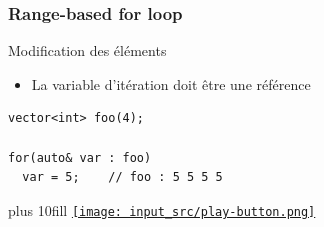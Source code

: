 \documentclass[C++.tex]{subfiles}
\begin{document}
\begin{frame}[fragile]
	\frametitle{Range-based for loop}
	\begin{alertblock}{Modification des éléments}
		\begin{itemize}
			\item La variable d'itération doit être une référence
		\end{itemize}
	\end{alertblock}

	\begin{lstlisting}
vector<int> foo(4);

for(auto& var : foo)
  var = 5;    // foo : 5 5 5 5\end{lstlisting}

	\vskip 10mm plus 10fill
	\hfill
	\href{https://godbolt.org/#z:OYLghAFBqd5QCxAYwPYBMCmBRdBLAF1QCcAaPECAMzwBtMA7AQwFtMQByARg9KtQYEAysib0QXACx8BBAKoBnTAAUAHpwAMvAFYTStJg1DIApACYAQuYukl9ZATwDKjdAGFUtAK4sGe1wAyeAyYAHI%2BAEaYxCAAzADspAAOqAqETgwe3r56KWmOAkEh4SxRMQm2mPYFDEIETMQEWT5%2BXJXVGXUNBEVhkdFxiQr1jc05bcPdvSVlgwCUtqhexMjsHOaxwcjeWADUJrFuTsPEmKwH2CYaAIIbWzuY%2B4cAbpgOJBdXtzfBBLssTGCEDmXxM8SsN12%2B3BXyhUOG6BAIFe72IByOgguu34qDBFmkuwAHKRdlwzCSEmCACIHCHXOHYkgQX67Z4NXYgRmoEGQuF42EM3YIpFoLx/dHo1nsiWHXZgDhy9axOkM6kC%2BEEREoJbiw6S%2BUmACsbgYBuVArVNwtMN5Gq1KKIaMOvyxOLxBOJpPJu0p8Rp5ttjOIECYYtQUuIHK5PPpfJtsYZwu1YqebklbMjMrcisVtPV0JpgaTot1adlBuNpqVKoLoN5/KLmqRDo%2BzsxsWwXIgkhBAYTQZDYfMADYI1GcTHVfHBWODlTdoa84HLf3%2BMHQ0Qx5yJ/mG/27SKdan09K9eWFWaa1CV4mm8nS/r1pXL9bC7c/V8OAtaJxDbw/BwWikKgnBppY1hCksKyPBsPCkAQmhfgsADWICGho%2BicJI/6IcBnC8AoIAYQhgFfqQcCwEgmCqG8YZkBQIbEMACjKIYVRCAgqAAO4AXBaAsEkdBMDUrEhLQHHcQBQH8YJ9AxMAXBkqQMl0NEADyYoSTxuHUW81xMYRHC8LpyB1PgAG8PwggiGI7BSDIgiKCo6ikaQuhtAYRgoNY1j6HgESEbAzBsCAESoKkBCkK8MTcPEf5zAsqBJDUhkALQInOpjgZYikEVBqx6AiwSiexnHadwvAEKcaxwVxxBMEkiHfr%2BOGuSBHDYDRyB0bsqiEsOqXDpIuzAMgyCklwAB0Zi7BAYFWJYJK4IQJD7GYsRcHMlVNQsCBnFgMTAqQqHoZhHDYaQUm8O1BFEfBO1nWYrVATd92kQlUXRGkziSEAA%3D%3D%3D}{\texttt{[image: input\_src/play-button.png]}}
\end{frame}
\end{document}
